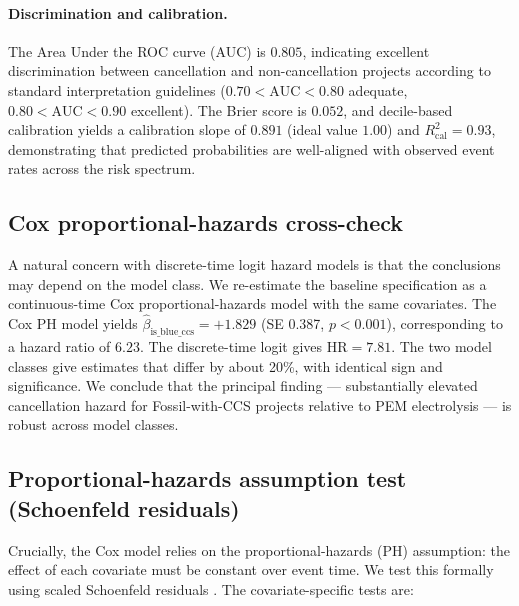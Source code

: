 \documentclass[11pt,a4paper]{article}
\begin{document}
\paragraph{Discrimination and calibration.} The Area Under the ROC curve (AUC) is $0.805$, indicating excellent discrimination between cancellation and non-cancellation projects according to standard interpretation guidelines ($0.70 < \mathrm{AUC} < 0.80$ adequate, $0.80 < \mathrm{AUC} < 0.90$ excellent). The Brier score is $0.052$, and decile-based calibration yields a calibration slope of $0.891$ (ideal value $1.00$) and $R^2_{\mathrm{cal}} = 0.93$, demonstrating that predicted probabilities are well-aligned with observed event rates across the risk spectrum.

\subsection{Cox proportional-hazards cross-check}

A natural concern with discrete-time logit hazard models is that the conclusions may depend on the model class. We re-estimate the baseline specification as a continuous-time Cox proportional-hazards model \citep{cox1972regression} with the same covariates. The Cox PH model yields $\hat\beta_{\mathrm{is\_blue\_ccs}} = +1.829$ (SE 0.387, $p < 0.001$), corresponding to a hazard ratio of $6.23$. The discrete-time logit gives $\mathrm{HR} = 7.81$. The two model classes give estimates that differ by about 20\%, with identical sign and significance. We conclude that the principal finding — substantially elevated cancellation hazard for Fossil-with-CCS projects relative to PEM electrolysis — is robust across model classes.

\subsection{Proportional-hazards assumption test (Schoenfeld residuals)}

Crucially, the Cox model relies on the proportional-hazards (PH) assumption: the effect of each covariate must be constant over event time. We test this formally using scaled Schoenfeld residuals \citep{grambsch1994proportional}. The covariate-specific tests are:
\end{document}
